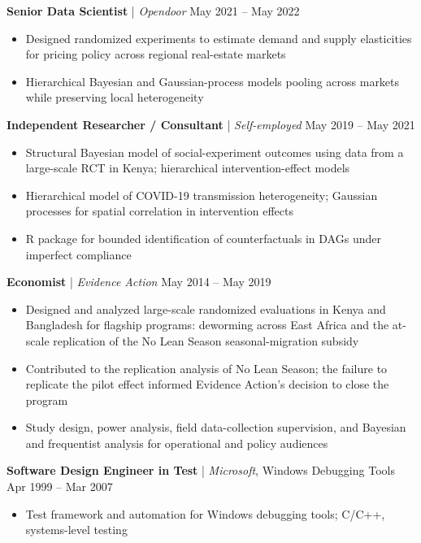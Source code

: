 \documentclass[11pt]{article}
\begin{document}
\medskip

\textbf{Senior Data Scientist} | \textit{Opendoor} \hfill May 2021 -- May 2022
\begin{itemize}
  \item Designed randomized experiments to estimate demand and supply elasticities for pricing policy across regional real-estate markets
  \item Hierarchical Bayesian and Gaussian-process models pooling across markets while preserving local heterogeneity
\end{itemize}

\medskip

\textbf{Independent Researcher / Consultant} | \textit{Self-employed} \hfill May 2019 -- May 2021
\begin{itemize}
  \item Structural Bayesian model of social-experiment outcomes using data from a large-scale RCT in Kenya; hierarchical intervention-effect models
  \item Hierarchical model of COVID-19 transmission heterogeneity; Gaussian processes for spatial correlation in intervention effects
  \item R package for bounded identification of counterfactuals in DAGs under imperfect compliance
\end{itemize}

\medskip

\textbf{Economist} | \textit{Evidence Action} \hfill May 2014 -- May 2019
\begin{itemize}
  \item Designed and analyzed large-scale randomized evaluations in Kenya and Bangladesh for flagship programs: deworming across East Africa and the at-scale replication of the No Lean Season seasonal-migration subsidy
  \item Contributed to the replication analysis of No Lean Season; the failure to replicate the pilot effect informed Evidence Action's decision to close the program
  \item Study design, power analysis, field data-collection supervision, and Bayesian and frequentist analysis for operational and policy audiences
\end{itemize}

\medskip

\textbf{Software Design Engineer in Test} | \textit{Microsoft}, Windows Debugging Tools \hfill Apr 1999 -- Mar 2007
\begin{itemize}
  \item Test framework and automation for Windows debugging tools; C/C++, systems-level testing
\end{itemize}
\end{document}
